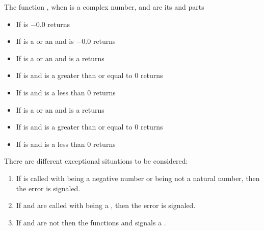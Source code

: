 \documentclass[../Comparisons-Predicates.tex]{subfiles}
\begin{document}
    \noindent
    The function , when  is a complex number, 
    and  are its  and  parts
    \begin{itemize}
        \item If  is $-0.0$ returns 
        \code{))}
        \item If  is a  or an
         and
         is
        $-0.0$ returns 
        \item If  is a  or an
         and
         is a
         returns 
        \item If  is  and
         is a greater than or equal to $0$ returns 
        \item If  is  and
         is a less than $0$ returns 
        \item If  is a  or an
         and
         is a
         returns 
        \item If  is  and
         is a greater than or equal to $0$ returns 
        \item If  is  and
         is a less than $0$ returns 
    \end{itemize}


    \DExceptional{}

    There are different exceptional situations to be considered:
    \begin{enumerate}
        \item If  is called with  being a negative
        number or being not a natural number, then the
         error
        is signaled.
        \item If  and  are called with
         being a , then the
         error is signaled.
        \item If  and  are not \CL{}
         then the functions  and 
        signals a .
    \end{enumerate}
\end{document}
